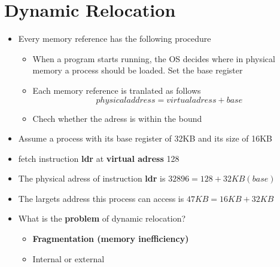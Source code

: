 \documentclass[a4paper,11pt,english]{article}
\begin{document}
\section*{Dynamic Relocation}
\begin{itemize}
    \item Every memory reference has the following procedure
        \begin{itemize}
            \item When a program starts running, the OS decides where in physical memory a process should be loaded. Set the base register
            \item Each memory reference is tranlated as follows
                \[
                    physical address = virtual adress + base
                \]
            \item Chech whether the adress is within the bound
        \end{itemize}
    \item Assume a process with its base register of 32KB and its size of 16KB
    \item fetch instruction \textbf{\color{blue} ldr} at \textbf{\color{blue} virtual adress} 128
    \item The physical adress of instruction \textbf{\color{blue} ldr} is $32896 = 128 + 32KB(base)$
    \item The largets address this process can access is $47KB = 16KB + 32KB$
    \item What is the \textbf{\color{red} problem} of dynamic relocation?
        \begin{itemize}
            \item \textbf{\color{red} Fragmentation (memory inefficiency)}
            \item Internal or external
        \end{itemize}
\end{itemize}
\end{document}
